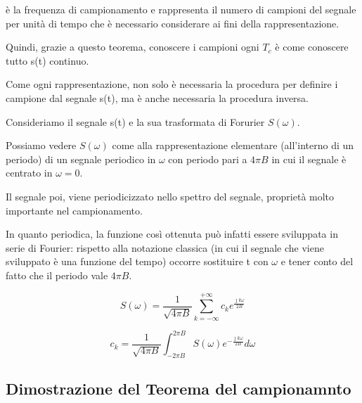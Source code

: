 è la frequenza di campionamento e rappresenta il numero di campioni del segnale per unità di tempo 
che è necessario considerare ai fini della rappresentazione. \newline 

Quindi, grazie a questo teorema, conoscere i campioni ogni $T_c$ è come conoscere tutto s(t) continuo. \newline 

Come ogni rappresentazione, non solo è necessaria la procedura per definire i campione dal segnale s(t), 
ma è anche necessaria la procedura inversa. \newline 

Consideriamo il segnale s(t) e la sua trasformata di Forurier $S(\omega)$. \newline 

Possiamo vedere $S(\omega)$ come alla rappresentazione elementare (all'interno di un periodo) di un segnale periodico in $\omega$ con periodo pari a $4\pi B$ 
in cui il segnale è centrato in $\omega = 0$. \newline 

Il segnale poi, viene periodicizzato nello spettro del segnale, proprietà molto importante nel campionamento. \newline 

In quanto periodica, la funzione così ottenuta può infatti essere sviluppata in serie di Fourier: 
rispetto alla notazione classica (in cui il segnale che viene sviluppato è una funzione del tempo) 
occorre sostituire t con $\omega$ e tener conto del fatto che il periodo vale $4 \pi B$. \newline 

{
    \Large 
    \begin{equation}
        S(\omega) 
        = 
        \frac{1}{\sqrt{4\pi B}} 
        \sum_{k = -\infty}^{+ \infty} 
        c_k e^{\frac{\jmath k \omega}{2B}}
    \end{equation}
}

{
    \Large 
    \begin{equation}
        c_k 
        = 
        \frac{1}{\sqrt{4 \pi B}} 
        \int_{-2 \pi B}^{2 \pi B}
        S(\omega) e^{-\frac{\jmath k \omega}{2B}} 
        d\omega
    \end{equation}
}

\newpage 

\subsection{Dimostrazione del Teorema del campionamnto}

